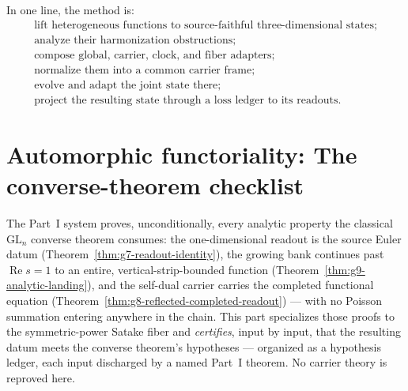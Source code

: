 \documentclass[11pt]{article}
\theoremstyle{definition}
\renewcommand{\Re}{\operatorname{Re}}
\begin{document}
In one line, the method is:
\[
\boxed{
\begin{gathered}
\text{lift heterogeneous functions to source-faithful three-dimensional states;}\\
\text{analyze their harmonization obstructions;}\\
\text{compose global, carrier, clock, and fiber adapters;}\\
\text{normalize them into a common carrier frame;}\\
\text{evolve and adapt the joint state there;}\\
\text{project the resulting state through a loss ledger to its readouts.}
\end{gathered}
}
\]


\part{Automorphic functoriality: The converse-theorem checklist}

\noindent The Part~I system proves, unconditionally, every analytic property the classical
$\mathrm{GL}_n$ converse theorem consumes: the one-dimensional readout is the source Euler datum
(Theorem~\ref{thm:g7-readout-identity}), the growing bank continues past $\Re s=1$ to an entire,
vertical-strip-bounded function (Theorem~\ref{thm:g9-analytic-landing}), and the self-dual carrier carries
the completed functional equation (Theorem~\ref{thm:g8-reflected-completed-readout}) --- with no Poisson
summation entering anywhere in the chain. This part specializes
those proofs to the symmetric-power Satake fiber and \emph{certifies}, input by input, that the resulting
datum meets the converse theorem's hypotheses --- organized as a hypothesis ledger, each input discharged by
a named Part~I theorem. No carrier theory is reproved here.
\end{document}
